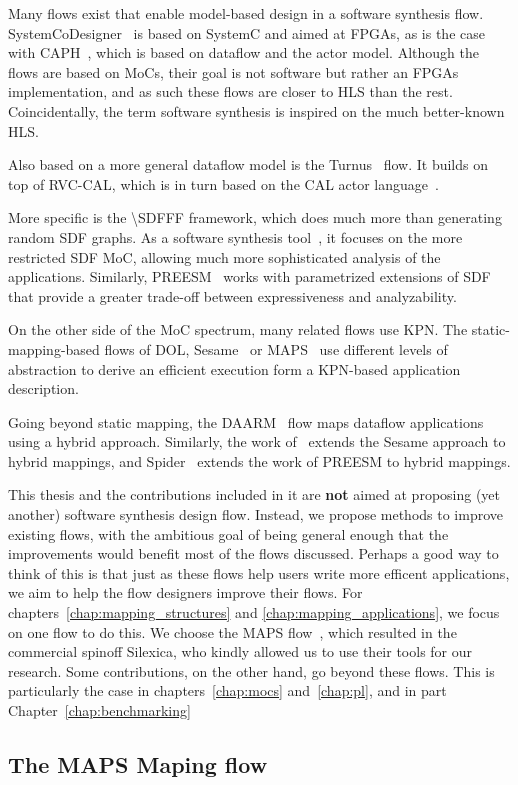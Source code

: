 Many flows exist that enable model-based design in a software synthesis flow.
SystemCoDesigner~\cite{haubelt2008systemcodesigner} is based on SystemC and aimed at \acsp{FPGA}, as is the case with CAPH~\cite{serot2013caph}, which is based on dataflow and the actor model.
Although the flows are based on \acp{MoC}, their goal is not software but rather an \acsp{FPGA} implementation, and as such these flows are closer to \ac{HLS} than the rest. 
Coincidentally, the term software synthesis is inspired on the much better-known \ac{HLS}.

Also based on a more general dataflow model is the Turnus~\cite{casale2013turnus} flow.
It builds on top of RVC-CAL, which is in turn based on the CAL actor language~\cite{cal}.

More specific is the \ac{\SDFFF}\cite{sdf3} framework, which does much more than generating random \ac{SDF} graphs.
As a software synthesis tool~\cite{stuijk2010predictable}, it focuses on the more restricted \ac{SDF} \ac{MoC}, allowing much more sophisticated analysis of the applications.
Similarly, PREESM~\cite{pelcat2014preesm} works with parametrized extensions of \ac{SDF}~\cite{desnos2013pimm} that provide a greater trade-off between expressiveness and analyzability.

On the other side of the \ac{MoC} spectrum, many related flows use \ac{KPN}.
The static-mapping-based flows of \ac{DOL}\cite{thiele2007dol}, Sesame~\cite{pimentel2006systematic} or \ac{MAPS}~\cite{maps} use different levels of abstraction to derive an efficient execution form a \ac{KPN}-based application description.

Going beyond static mapping, the DAARM~\cite{weichslgartner2014daarm} flow maps dataflow applications using a hybrid approach.
Similarly, the work of~\cite{quan2015hybrid} extends the Sesame approach to hybrid mappings, and Spider~\cite{heulot2014spider} extends the work of PREESM to hybrid mappings.

This thesis and the contributions included in it are \textbf{not} aimed at proposing (yet another) software synthesis design flow.
Instead, we propose methods to improve existing flows, with the ambitious goal of being general enough that the improvements would benefit most of the flows discussed. 
Perhaps a good way to think of this is that just as these flows help users write more efficent applications, we aim to help the flow designers improve their flows.
For chapters~\ref{chap:mapping_structures} and \ref{chap:mapping_applications}, we focus on one flow to do this.
We choose the \ac{MAPS} flow~\cite{maps}, which resulted in the commercial spinoff Silexica, who kindly allowed us to use their tools for our research.
Some contributions, on the other hand, go beyond these flows. This is particularly the case in chapters~\ref{chap:mocs} and~\ref{chap:pl}, and in part Chapter~\ref{chap:benchmarking} 

\subsection{The \ac{MAPS} Maping flow}
